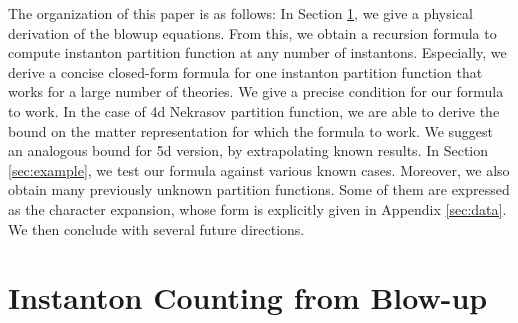 \documentclass[letterpaper, 11pt]{article}
\begin{document}
The organization of this paper is as follows: In Section \ref{sec:blowup}, we give a physical derivation of the blowup equations. From this, we obtain a recursion formula to compute instanton partition function at any number of instantons. Especially, we derive a concise closed-form formula for one instanton partition function that works for a large number of theories. We give a precise condition for our formula to work. In the case of 4d Nekrasov partition function, we are able to derive the bound on the matter representation for which the formula to work. We suggest an analogous bound for 5d version, by extrapolating known results. In Section \ref{sec:example}, we test our formula against various known cases. Moreover, we also obtain many previously unknown partition functions. Some of them are expressed as the character expansion, whose form is explicitly given in Appendix \ref{sec:data}. We then conclude with several future directions.

%
%

\section{Instanton Counting from Blow-up} \label{sec:blowup}
\end{document}
